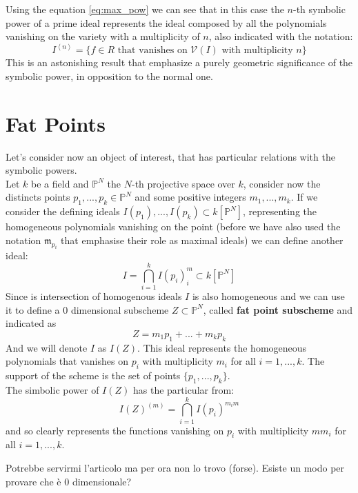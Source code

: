 \documentclass[]{book}
\theoremstyle{plain}
\theoremstyle{remark}
\theoremstyle{definition}
\newcommand{\PP}{\mathbb{P}}
\newcommand{\mm}{\mathfrak{m}}
\begin{document}
Using the equation \ref{eq:max_pow} we can see that in this case the $ n $-th symbolic power of a prime ideal represents the ideal composed by all the polynomials vanishing on the variety with a multiplicity of $ n $, also indicated with the notation:
\begin{equation}\label{eq:ideal_vanish}
	I^{\left<n\right>} = \{ f \in R \text{ that vanishes on } \mathcal{V}(I) \text{ with multiplicity } n\}
\end{equation}
This is an astonishing result that emphasize a purely geometric significance of the symbolic power, in opposition to the normal one. 


\section{Fat Points}

Let's consider now an object of interest, that has particular relations with the symbolic powers.\\
Let $ k $ be a field and $ \PP^N$ the $ N $-th projective space over $ k $, consider now the distincts points $ p_1, ... ,p_k \in  \PP^N$ and some positive integers $ m_1 , ... ,m_k $. If we consider the defining ideals $ I(p_1), ... , I(p_k)  \subset k [\PP^N]$, representing the homogeneous polynomials vanishing on the point (before we have also used the notation $ \mm_{p_i}$ that emphasise their role as maximal ideals) we can define another ideal:
\begin{equation}\label{eq:fat_pt}
	I = \bigcap_{i=1}^k I(p_i)^m_i \subset k [\PP^N]
\end{equation}
Since is intersection of homogenous ideals $ I $ is also homogeneous and we can use it to define a $ 0 $ dimensional subscheme $ Z \subset \PP^N $, called \textbf{fat point subscheme} and indicated as 
\[
Z = m_1 p_1 + ... +  m_k p_k
\]
And we will denote $ I $ as $ I(Z) $. This ideal represents the homogeneous polynomials that vanishes on $ p_i $ with multiplicity $ m_i $ for all $ i = 1, ... , k $. The support of the scheme is the set of points $ \{ p_1 , ... , p_k\} $.\\
The simbolic power of $ I(Z) $ has the particular from:
\[
I(Z)^{(m)} = \bigcap_{i=1}^k I(p_i)^{m_im}
\]
and so clearly represents the functions vanishing on $ p_i $ with multiplicity $ mm_i $ for all $ i = 1, ... , k $. 


\begin{tboxque}
Potrebbe servirmi l'articolo \cite{Gimigliano89} ma per ora non lo trovo (forse).
Esiste un modo per provare che è 0 dimensionale? %
\end{tboxque}
\end{document}
